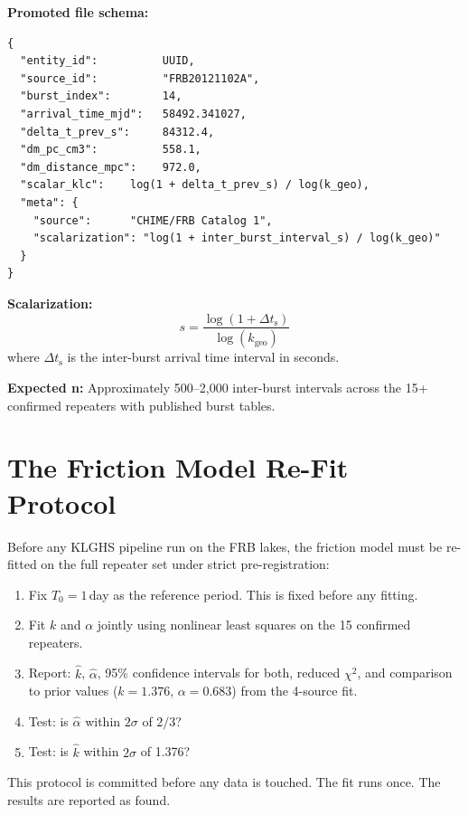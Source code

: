 \documentclass[11pt, letterpaper, openany]{book}
\begin{document}
\textbf{Promoted file schema:}
\begin{lstlisting}
{
  "entity_id":          UUID,
  "source_id":          "FRB20121102A",
  "burst_index":        14,
  "arrival_time_mjd":   58492.341027,
  "delta_t_prev_s":     84312.4,
  "dm_pc_cm3":          558.1,
  "dm_distance_mpc":    972.0,
  "scalar_klc":    log(1 + delta_t_prev_s) / log(k_geo),
  "meta": {
    "source":      "CHIME/FRB Catalog 1",
    "scalarization": "log(1 + inter_burst_interval_s) / log(k_geo)"
  }
}
\end{lstlisting}

\textbf{Scalarization:}
\[
s = \frac{\log(1 + \Delta t_\text{s})}{\log(k_\text{geo})}
\]
where $\Delta t_\text{s}$ is the inter-burst arrival time interval in seconds.

\textbf{Expected n:} Approximately 500--2,000 inter-burst intervals across
the 15+ confirmed repeaters with published burst tables.

\section{The Friction Model Re-Fit Protocol}

Before any KLGHS pipeline run on the FRB lakes, the friction model must
be re-fitted on the full repeater set under strict pre-registration:

\begin{enumerate}
    \item Fix $T_0 = 1$\,day as the reference period. This is fixed before
    any fitting.
    \item Fit $k$ and $\alpha$ jointly using nonlinear least squares on
    the 15 confirmed repeaters.
    \item Report: $\hat{k}$, $\hat{\alpha}$, 95\% confidence intervals
    for both, reduced $\chi^2$, and comparison to prior values
    ($k = 1.376$, $\alpha = 0.683$) from the 4-source fit.
    \item Test: is $\hat{\alpha}$ within $2\sigma$ of $2/3$?
    \item Test: is $\hat{k}$ within $2\sigma$ of 1.376?
\end{enumerate}

This protocol is committed before any data is touched. The fit runs once.
The results are reported as found.

\clearpage
\end{document}
